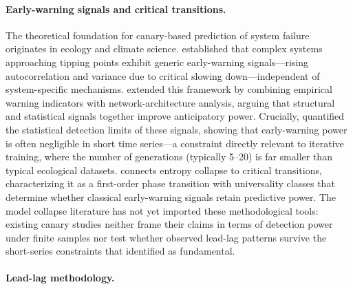 \paragraph{Early-warning signals and critical transitions.}

The theoretical foundation for canary-based prediction of system failure originates in ecology and climate science.
\citet{scheffer2009early} established that complex systems approaching tipping points exhibit generic early-warning signals---rising autocorrelation and variance due to critical slowing down---independent of system-specific mechanisms.
\citet{scheffer2012anticipating} extended this framework by combining empirical warning indicators with network-architecture analysis, arguing that structural and statistical signals together improve anticipatory power.
Crucially, \citet{boettiger2012limits} quantified the statistical detection limits of these signals, showing that early-warning power is often negligible in short time series---a constraint directly relevant to iterative training, where the number of generations (typically 5--20) is far smaller than typical ecological datasets.
\citet{truong2025entropy} connects entropy collapse to critical transitions, characterizing it as a first-order phase transition with universality classes that determine whether classical early-warning signals retain predictive power.
The model collapse literature has not yet imported these methodological tools: existing canary studies neither frame their claims in terms of detection power under finite samples nor test whether observed lead-lag patterns survive the short-series constraints that \citet{boettiger2012limits} identified as fundamental.

\paragraph{Lead-lag methodology.}

